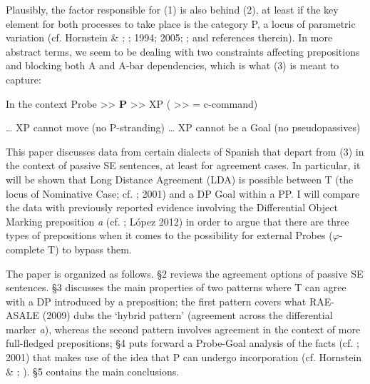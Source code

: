\documentclass[output=paper]{langsci/langscibook}
\begin{document}
    \z
{}

Plausibly, the factor responsible for (1) is also behind (2), at least if the key element for both processes to take place is the category P, a locus of parametric variation (cf. Hornstein \& \citealt{Weinberg1981}; \citealt{Kayne1984}; 1994; 2005; \citealt{Abels2003}; and references therein). In more abstract terms, we seem to be dealing with two constraints affecting prepositions and blocking both A and A-bar dependencies, which is what (3) is meant to capture:

\ea%
    \label{ex:gallego:3}
     In the context Probe >>  \textbf{P}  >>  XP  ( >> = c-command)\\
     \begin{xlisti}\setcounter{xnumii}{1}
     \ex \ldots\xspace XP cannot move (no P-stranding)
     \ex \ldots\xspace XP cannot be a Goal (no pseudopassives)
     \end{xlisti}
\z

This paper discusses data from certain dialects of Spanish that depart from (3) in the context of passive SE sentences, at least for agreement cases. In particular, it will be shown that Long Distance Agreement (LDA) is possible between T (the locus of Nominative Case; cf. \citealt{Chomsky2000}; 2001) and a DP Goal within a PP. I will compare the data with previously reported evidence involving the Differential Object Marking preposition \textit{a} (cf. \citealt{Torrego1998}; López 2012) in order to argue that there are three types of prepositions when it comes to the possibility for external Probes ($\varphi $-complete T) to bypass them.

The paper is organized as follows. §2 reviews the agreement options of passive SE sentences. §3 discusses the main properties of two patterns where T can agree with a DP introduced by a preposition; the first pattern covers what RAE-ASALE (2009) dubs the ‘hybrid pattern’ (agreement across the differential marker \textit{a}), whereas the second pattern involves agreement in the context of more full-fledged prepositions; §4 puts forward a Probe-Goal analysis of the facts (cf. \citealt{Chomsky2000}; 2001) that makes use of the idea that P can undergo incorporation (cf. Hornstein \& \citealt{Weinberg1981}; \citealt{Law2006}). §5 contains the main conclusions.
\end{document}

